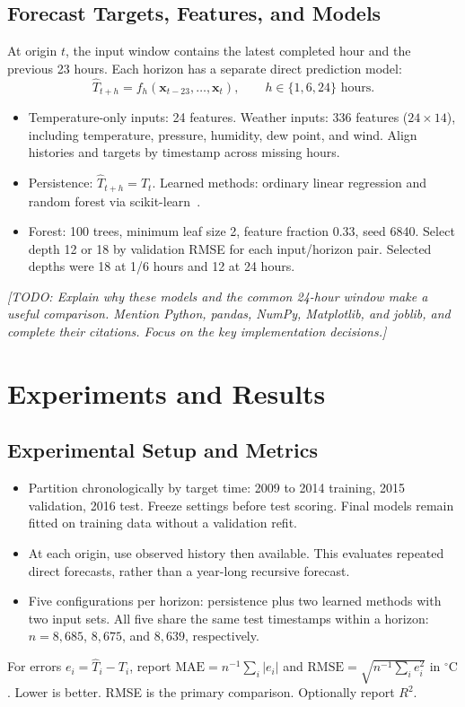 \documentclass[11pt]{article}
\newcommand{\todo}[1]{\par\smallskip\noindent
  {\color{blue!60!black}\textit{[TODO: #1]}}\par\smallskip}
\newcommand{\degc}{\ensuremath{{}^{\circ}\mathrm{C}}}
\begin{document}
\subsection{Forecast Targets, Features, and Models}
At origin $t$, the input window contains the latest completed hour and the
previous 23 hours. Each horizon has a separate direct prediction model:
\[
  \widehat{T}_{t+h}=f_h(\mathbf{x}_{t-23},\ldots,\mathbf{x}_{t}),
  \qquad h\in\{1,6,24\}\text{ hours}.
\]
\begin{itemize}
  \item Temperature-only inputs: 24 features. Weather inputs: 336 features
  ($24\times14$), including temperature, pressure, humidity, dew point,
  and wind. Align histories and targets by timestamp across missing hours.
  \item Persistence: $\widehat{T}_{t+h}=T_t$. Learned methods:
  ordinary linear regression and random forest via scikit-learn~\cite{sklearn}.
  \item Forest: 100 trees, minimum leaf size 2, feature fraction 0.33,
  seed 6840. Select depth 12 or 18 by validation RMSE for each input/horizon
  pair. Selected depths were 18 at 1/6 hours and 12 at 24 hours.
\end{itemize}
\todo{Explain why these models and the common 24-hour window make a useful
comparison. Mention Python, pandas, NumPy, Matplotlib, and joblib, and
complete their citations. Focus on the key implementation decisions.}

\section{Experiments and Results}
\label{sec:results}
\subsection{Experimental Setup and Metrics}
\begin{itemize}
  \item Partition chronologically by target time: 2009 to 2014 training,
  2015 validation, 2016 test. Freeze settings before test scoring.
  Final models remain fitted on training data without a validation refit.
  \item At each origin, use observed history then available. This evaluates
  repeated direct forecasts, rather than a year-long recursive forecast.
  \item Five configurations per horizon: persistence plus two learned
  methods with two input sets. All five share the same test timestamps
  within a horizon: $n=8{,}685$, $8{,}675$, and $8{,}639$, respectively.
\end{itemize}
For errors $e_i=\widehat{T}_i-T_i$, report
$\mathrm{MAE}=n^{-1}\sum_i|e_i|$ and
$\mathrm{RMSE}=\sqrt{n^{-1}\sum_i e_i^2}$ in \degc{}. Lower is better.
RMSE is the primary comparison. Optionally report $R^2$.
\end{document}
